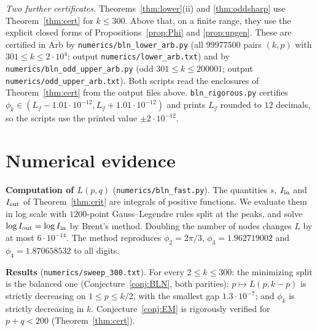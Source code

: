 \documentclass[11pt]{amsart}
\theoremstyle{definition}
\begin{document}
\noindent\emph{Two further certificates.} Theorems~\ref{thm:lower}(ii) and \ref{thm:oddsharp} use Theorem~\ref{thm:cert} for $k\le300$. Above that, on a finite
range, they use the explicit closed forms of Propositions~\ref{prop:Phi} and \ref{prop:upgen}. These are certified in Arb by
\texttt{numerics/bln\_lower\_arb.py} (all $99977500$ pairs $(k,p)$ with $301\le k\le2\cdot10^4$; output \texttt{numerics/lower\_arb.txt}) and by
\texttt{numerics/bln\_odd\_upper\_arb.py} (odd $301\le k\le200001$; output \texttt{numerics/odd\_upper\_arb.txt}). Both scripts read the enclosures of
Theorem~\ref{thm:cert} from the output files above. \texttt{bln\_rigorous.py} certifies $\phi_k\in(L_f-1.01\cdot10^{-12},L_f+1.01\cdot10^{-12})$ and
prints $L_f$ rounded to $12$ decimals, so the scripts use the printed value $\pm2\cdot10^{-12}$.

\section{Numerical evidence}\label{sec:num}

\noindent\textbf{Computation of $L(p,q)$} (\texttt{numerics/bln\_fast.py}). The quantities $s$, $I_{\rm in}$ and $I_{\rm out}$ of
Theorem~\ref{thm:crit} are integrals of positive functions. We evaluate them in log scale with $1200$-point Gauss--Legendre rules split at
the peaks, and solve $\log I_{\rm out}=\log I_{\rm in}$ by Brent's method. Doubling the number of nodes changes $L$ by at most
$6\cdot10^{-14}$. The method reproduces $\phi_2=2\pi/3$, $\phi_3=1.962719002$ and $\phi_4=1.870658532$ to all digits.

\noindent\textbf{Results} (\texttt{numerics/sweep\_300.txt}). For every $2\le k\le300$: the minimizing split is the balanced one
(Conjecture~\ref{conj:BLN}, both parities); $p\mapsto L(p,k-p)$ is strictly decreasing on $1\le p\le k/2$, with the smallest gap
$1.3\cdot10^{-7}$; and $\phi_k$ is strictly decreasing in $k$. Conjecture~\ref{conj:EM} is rigorously verified for $p+q<200$ (Theorem~\ref{thm:cert}).
\end{document}
